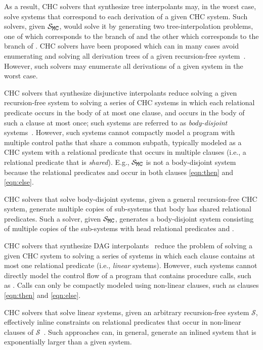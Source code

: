 As a result, CHC solvers that synthesize tree interpolants may, in the
worst case, solve systems that correspond to each derivation of a
given CHC system.
%
Such solvers, given $\mcchc$, would solve it by generating two
tree-interpolation problems, one of which corresponds to the 
branch of  and the other which corresponds to the
 branch of .
%
CHC solvers have been proposed which can in many cases avoid
enumerating and solving all derivation trees of a given recursion-free
system~\cite{mcmillan14}.
%
However, such solvers may enumerate all derivations of a given system
in the worst case.

CHC solvers that synthesize disjunctive interpolants reduce solving a
given recursion-free system to solving a series of CHC systems in
which each relational predicate occurs in the body of at most one
clause, and occurs in the body of such a clause at most once;
%
such systems are referred to as \emph{body-disjoint}
systems~\cite{rummer13a,rummer13b}.
%
However, such systems cannot compactly model a program with multiple
control paths that share a common subpath, typically modeled as a CHC
system with a relational predicate that occurs in multiple clauses
(i.e., a relational predicate that is \emph{shared}).
%
E.g., $\mcchc$ is not a body-disjoint system because the relational
predicates  and  occur in both clauses
\autoref{eqn:then} and \autoref{eqn:else}.

CHC solvers that solve body-disjoint systems, given a general recursion-free CHC system,
generate multiple copies of sub-systems that body has shared
relational predicates.
%
Such a solver, given $\mcchc$, generates a body-disjoint system
consisting of multiple copies of the sub-systems with head relational
predicates  and .

CHC solvers that synthesize DAG interpolants~\cite{albarghouthi12a}
reduce the problem of solving a given CHC system to solving a series
of systems in which each clause contains at most one relational
predicate (i.e., \emph{linear} systems).
%
However, such systems cannot directly model the control flow of a
program that contains procedure calls, such as .
%
Calls can only be compactly modeled using non-linear clauses, such as
clauses \autoref{eqn:then} and \autoref{eqn:else}.

CHC solvers that solve linear systems, given an arbitrary
recursion-free system $\mathcal{S}$, effectively inline constraints on
relational predicates that occur in non-linear clauses of
$\mathcal{S}$~\cite{albarghouthi12b}.
%
Such approaches can, in general, generate an inlined system that is
exponentially larger than a given system.

